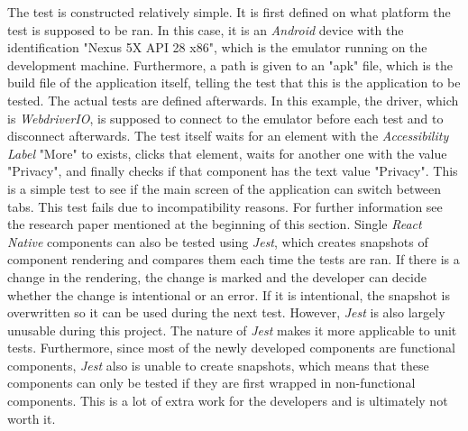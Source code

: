 The test is constructed relatively simple. It is first defined on what platform the test is supposed to be ran. In this case, it is an \textit{Android} device with the identification "Nexus 5X API 28 x86", which is the emulator running on the development machine. Furthermore, a path is given to an "apk" file, which is the build file of the application itself, telling the test that this is the application to be tested.
\newline
The actual tests are defined afterwards. In this example, the driver, which is \textit{WebdriverIO}, is supposed to connect to the emulator before each test and to disconnect afterwards. The test itself waits for an element with the \textit{Accessibility Label} "More" to exists, clicks that element, waits for another one with the value "Privacy", and finally checks if that component has the text value "Privacy". This is a simple test to see if the main screen of the application can switch between tabs. This test fails due to incompatibility reasons. For further information see the research paper mentioned at the beginning of this section.
\newline
Single \textit{React Native} components can also be tested using \textit{Jest}, which creates snapshots of component rendering and compares them each time the tests are ran. If there is a change in the rendering, the change is marked and the developer can decide whether the change is intentional or an error. If it is intentional, the snapshot is overwritten so it can be used during the next test.
\newline
However, \textit{Jest} is also largely unusable during this project. The nature of \textit{Jest} makes it more applicable to unit tests. Furthermore, since most of the newly developed components are functional components, \textit{Jest} also is unable to create snapshots, which means that these components can only be tested if they are first wrapped in non-functional components. This is a lot of extra work for the developers and is ultimately not worth it.